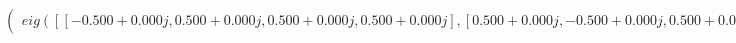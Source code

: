 \documentclass[border=1em]{standalone}
\begin{document}
$
\left(
\begin{array}{cccc}
e
i
g
(
[
[
-
0
.
5
0
0
+
0
.
0
0
0
j
,
 
0
.
5
0
0
+
0
.
0
0
0
j
,
 
0
.
5
0
0
+
0
.
0
0
0
j
,
 
0
.
5
0
0
+
0
.
0
0
0
j
]
,
[
0
.
5
0
0
+
0
.
0
0
0
j
,
 
-
0
.
5
0
0
+
0
.
0
0
0
j
,
 
0
.
5
0
0
+
0
.
0
0
0
j
,
 
0
.
5
0
0
+
0
.
0
0
0
j
]
,
[
0
.
5
0
0
+
0
.
0
0
0
j
,
 
0
.
5
0
0
+
0
.
0
0
0
j
,
 
-
0
.
5
0
0
+
0
.
0
0
0
j
,
 
0
.
5
0
0
+
0
.
0
0
0
j
]
,
[
0
.
5
0
0
+
0
.
0
0
0
j
,
 
0
.
5
0
0
+
0
.
0
0
0
j
,
 
0
.
5
0
0
+
0
.
0
0
0
j
,
 
-
0
.
5
0
0
+
0
.
0
0
0
j
]
]
)
\end{array}
\right)
$
\end{document}
